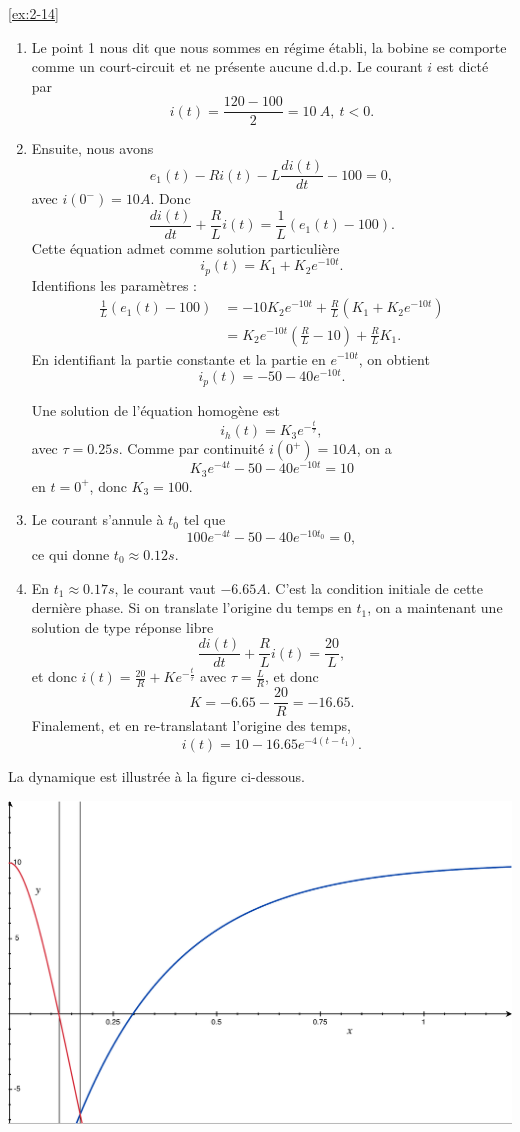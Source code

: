 \begin{solexercise}{\ref{ex:2-14}}
	\label{solex:2-14}
\begin{enumerate}
	\item Le point 1 nous dit que nous sommes en r\'egime \'etabli, la bobine se comporte comme un court-circuit et ne pr\'esente aucune d.d.p. Le courant $i$ est dict\'e par 
	$$i(t) = \frac{120-100}{2} = 10 \ A, \ t < 0.$$
	\item Ensuite, nous avons 
	$$e_1(t) - R i(t) - L \frac{di(t)}{dt} - 100 = 0,$$
	avec $i(0^-) = 10 A$.
	Donc 
	$$\frac{di(t)}{dt} + \frac{R}{L} i(t)  = \frac{1}{L} (e_1(t)-100).$$
	Cette \'equation admet comme solution particuli\`ere $$i_p(t) = K_1 + K_2 e^{-10t}.$$
	Identifions les param\`etres :
	\begin{align*}
	\frac{1}{L} (e_1(t)-100) &= -10 K_2 e^{-10t} + \frac{R}{L} (K_1 + K_2 e^{-10t}) \\
	&= K_2 e^{-10t} (\frac{R}{L} -10 ) + \frac{R}{L} K_1.
	\end{align*}
	En identifiant la partie constante et la partie en $e^{-10t}$, on obtient 
	$$i_p(t) = -50-40 e^{-10t}.$$
	
	Une solution de l'\'equation homog\`ene est $$i_h(t) = K_3 e^{-\frac{t}{\tau}},$$  avec $\tau = 0.25 s$. Comme par continuit\'e $i(0^+) = 10 A$, on a
	$$K_3 e^{-4t} -50-40 e^{-10t} = 10$$
	en $t = 0^+$, donc $K_3 = 100$.
	\item 
	Le courant s'annule \`a $t_0$ tel que $$100 e^{-4t} -50-40 e^{-10t_0} = 0,$$
	ce qui donne $t_0 \approx 0.12 s$. 
	\item En $t_1 \approx 0.17s$, le courant vaut $-6.65 A$. C'est la condition initiale de cette derni\`ere phase. Si on translate l'origine du temps en $t_1$, on a maintenant une solution de type r\'eponse libre
	$$\frac{di(t)}{dt} + \frac{R}{L} i(t)  = \frac{20}{L},$$
	et donc $i(t) = \frac{20}{R} + K e^{-\frac{t}{\tau}}$ avec $\tau = \frac{L}{R}$, et donc $$K = -6.65 - \frac{20}{R} = -16.65.$$
	Finalement, et en re-translatant l'origine des temps,  $$i(t) = 10 - 16.65 e^{-4(t-t_1)}.$$
\end{enumerate}
La dynamique est illustr\'ee \`a la figure ci-dessous.
\begin{center}
\includegraphics[width=0.7\linewidth]{figs/ex_RLC}
\end{center}

\end{solexercise}